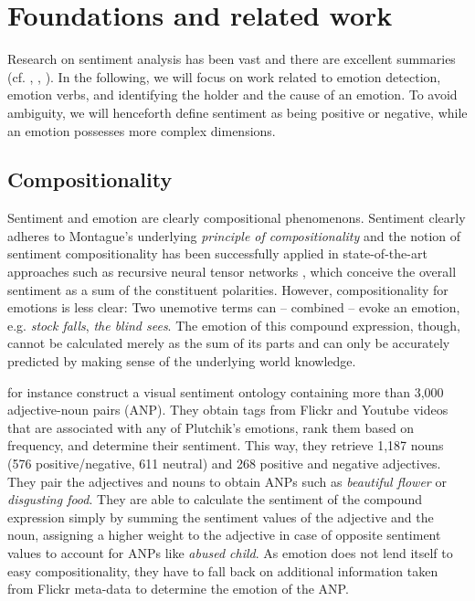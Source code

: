 
\chapter{Foundations and related work} %

\label{ch:foundations} 


Research on sentiment analysis has been vast and there are excellent summaries (cf. \cite{sentiment_analysis_summary_pang}, \cite{sentiment_analysis_summary_liu}, \cite{sentiment_analysis_association_metrics}). In the following, we will focus on work related to emotion detection, emotion verbs, and identifying the holder and the cause of an emotion. To avoid ambiguity, we will henceforth define sentiment as being positive or negative, while an emotion possesses more complex dimensions.

\section{Compositionality}

Sentiment and emotion are clearly compositional phenomenons. Sentiment clearly adheres to Montague's underlying \textit{principle of compositionality} and the notion of sentiment compositionality has been successfully applied in state-of-the-art approaches such as recursive neural tensor networks \cite{deep_sentiment_analysis}, which conceive the overall sentiment as a sum of the constituent polarities. However, compositionality for emotions is less clear: Two unemotive terms can -- combined -- evoke an emotion, e.g. \textit{stock falls}, \textit{the blind sees}. The emotion of this compound expression, though, cannot be calculated merely as the sum of its parts and can only be accurately predicted by making sense of the underlying world knowledge.

\citeauthor{adjective_noun_pairs} for instance construct a visual sentiment ontology containing more than 3,000 adjective-noun pairs (ANP). They obtain tags from Flickr and Youtube videos that are associated with any of Plutchik's emotions, rank them based on frequency, and determine their sentiment. This way, they retrieve 1,187 nouns (576 positive/negative, 611 neutral) and 268 positive and negative adjectives. They pair the adjectives and nouns to obtain ANPs such as \textit{beautiful flower} or \textit{disgusting food}. They are able to calculate the sentiment of the compound expression simply by summing the sentiment values of the adjective and the noun, assigning a higher weight to the adjective in case of opposite sentiment values to account for ANPs like \textit{abused child}. As emotion does not lend itself to easy compositionality, they have to fall back on additional information taken from Flickr meta-data to determine the emotion of the ANP.

